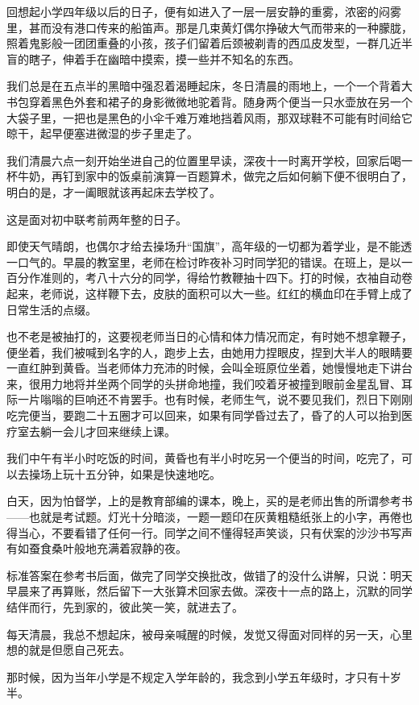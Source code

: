 \par 回想起小学四年级以后的日子，便有如进入了一层一层安静的重雾，浓密的闷雾里，甚而没有港口传来的船笛声。那是几束黄灯偶尔挣破大气而带来的一种朦胧，照着鬼影般一团团重叠的小孩，孩子们留着后颈被剃青的西瓜皮发型，一群几近半盲的瞎子，伸着手在幽暗中摸索，摸一些并不知名的东西。
\par 我们总是在五点半的黑暗中强忍着渴睡起床，冬日清晨的雨地上，一个一个背着大书包穿着黑色外套和裙子的身影微微地驼着背。随身两个便当一只水壶放在另一个大袋子里，一把也是黑色的小伞千难万难地挡着风雨，那双球鞋不可能有时间给它晾干，起早便塞进微湿的步子里走了。
\par 我们清晨六点一刻开始坐进自己的位置里早读，深夜十一时离开学校，回家后喝一杯牛奶，再钉到家中的饭桌前演算一百题算术，做完之后如何躺下便不很明白了，明白的是，才一阖眼就该再起床去学校了。
\par 这是面对初中联考前两年整的日子。
\par 即使天气晴朗，也偶尔才给去操场升“国旗”，高年级的一切都为着学业，是不能透一口气的。早晨的教室里，老师在检讨昨夜补习时同学犯的错误。在班上，是以一百分作准则的，考八十六分的同学，得给竹教鞭抽十四下。打的时候，衣袖自动卷起来，老师说，这样鞭下去，皮肤的面积可以大一些。红红的横血印在手臂上成了日常生活的点缀。
\par 也不老是被抽打的，这要视老师当日的心情和体力情况而定，有时她不想拿鞭子，便坐着，我们被喊到名字的人，跑步上去，由她用力捏眼皮，捏到大半人的眼睛要一直红肿到黄昏。当老师体力充沛的时候，会叫全班原位坐着，她慢慢地走下讲台来，很用力地将并坐两个同学的头拼命地撞，我们咬着牙被撞到眼前金星乱冒、耳际一片嗡嗡的巨响还不肯罢手。也有时候，老师生气，说不要见我们，烈日下刚刚吃完便当，要跑二十五圈才可以回来，如果有同学昏过去了，昏了的人可以抬到医疗室去躺一会儿才回来继续上课。
\par 我们中午有半小时吃饭的时间，黄昏也有半小时吃另一个便当的时间，吃完了，可以去操场上玩十五分钟，如果是快速地吃。
\par 白天，因为怕督学，上的是教育部编的课本，晚上，买的是老师出售的所谓参考书——也就是考试题。灯光十分暗淡，一题一题印在灰黄粗糙纸张上的小字，再倦也得当心，不要看错了任何一行。同学之间不懂得轻声笑谈，只有伏案的沙沙书写声有如蚕食桑叶般地充满着寂静的夜。
\par 标准答案在参考书后面，做完了同学交换批改，做错了的没什么讲解，只说：明天早晨来了再算账，然后留下一大张算术回家去做。深夜十一点的路上，沉默的同学结伴而行，先到家的，彼此笑一笑，就进去了。
\par 每天清晨，我总不想起床，被母亲喊醒的时候，发觉又得面对同样的另一天，心里想的就是但愿自己死去。
\par 那时候，因为当年小学是不规定入学年龄的，我念到小学五年级时，才只有十岁半。
